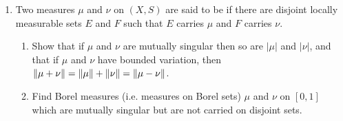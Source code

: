 \begin{enumerate}[label=\arabic*),ref=\arabic*]
\item Two measures $\mu$ and $\nu$ on $(X, S)$ are said to be  if there are disjoint locally measurable sets $E$ and $F$ such that $E$ carries $\mu$ and $F$ carries $\nu$.
\begin{enumerate}
\item Show that if $\mu$ and $\nu$ are mutually singular then so are $|\mu|$ and $|\nu|$, and that if $\mu$ and $\nu$ have bounded variation, then $\norm{\mu+\nu}=\norm{\mu}+\norm{\nu}=\norm{\mu-\nu}$.
\item Find Borel measures (i.e. measures on Borel sets) $\mu$ and $\nu$ on $[0,1]$ which are mutually singular but are not carried on disjoint  sets.
\end{enumerate}
\end{enumerate}